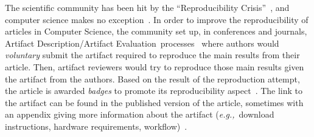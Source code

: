 \documentclass[sigconf,natbib=false]{acmart}
\newcommand{\eg}{\emph{e.g.,}}
\newcommand{\ad}{Artifact Description}
\newcommand{\aeval}{Artifact Evaluation}
\newcommand{\adae}{\ad/\aeval}
\newcommand{\todo}[1]{{\color{red}{TODO: #1}}}
\begin{document}
% 

The scientific community has been hit by the ``Reproducibility Crisis''~\cite{baker500ScientistsLift2016}, and computer science makes no exception~\cite{collberg_repeatability_2015}.
In order to improve the reproducibility of articles in Computer Science, the community set up, in conferences and journals, \adae\ processes~\cite{kidwell2016badges} where authors would \emph{voluntary} submit the artifact required to reproduce the main results from their article.
Then, artifact reviewers would try to reproduce those main results given the artifact from the authors.
Based on the result of the reproduction attempt, the article is awarded \emph{badges} to promote its reproducibility aspect~\cite{acm-badges}.
The link to the artifact can be found in the published version of the article, sometimes with an appendix giving more information about the artifact (\eg\ download instructions, hardware requirements, workflow)~\cite{paperswithcode, kang2023papers, hong2013software}.
\end{document}
